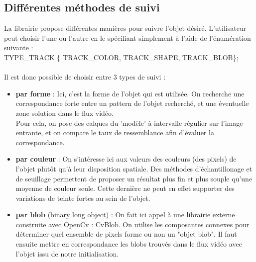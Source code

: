 \documentclass{article}
\begin{document}
\subsection{Différentes méthodes de suivi}
La librairie propose différentes manières pour suivre l'objet désiré. L'utilisateur peut choisir l'une ou l'autre en le spécifiant simplement à l'aide de l'énumération suivante :\\
TYPE\_TRACK \{ TRACK\_COLOR, TRACK\_SHAPE, TRACK\_BLOB\};
\paragraph{}
Il est donc possible de choisir entre 3 types de suivi : \\
\begin{itemize}
\item {\textbf{par forme} : } Ici, c'est la forme de l'objet qui est utilisée. On recherche une correspondance forte entre un pattern de l'objet recherché, et une éventuelle zone solution dans le flux vidéo. \\
Pour cela, on pose des calques du 'modèle' à intervalle régulier sur l'image entrante, et on compare le taux de ressemblance afin d'évaluer la correspondance.\\
\item {\textbf{par couleur} : } On s'intéresse ici aux valeurs des couleurs (des pixels) de l'objet plutôt qu'à leur disposition spatiale. Des méthodes d'échantillonage et de seuillage permettent de proposer un résultat plus fin et plus souple qu'une moyenne de couleur seule. Cette dernière ne peut en effet supporter des variations de teinte fortes au sein de l'objet.\\
\item {\textbf{par blob} (binary long object) : } On fait ici appel à une librairie externe construite avec OpenCv : CvBlob. On utilise les composantes connexes pour déterminer quel ensemble de pixels forme ou non un "objet blob". Il faut ensuite mettre en correspondance les blobs trouvés dans le flux vidéo avec l'objet issu de notre initialisation.
\end{itemize}
\end{document}
